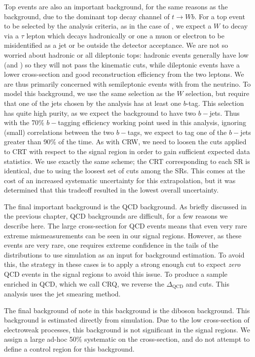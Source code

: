 Top events are also an important background, for the same reasons as the \wjets background, due to the dominant top decay channel of $t \rightarrow Wb$.
For a top event to be selected by the analysis criteria, as in the case of \wjets, we expect a $W$ to decay via a $\tau$ lepton which decays hadronically or one a muon or electron to be misidentified as a jet or be outside the detector acceptance.
We are not so worried about hadronic or all dileptonic tops: hadronic \ttbar events generally have low \met (and ) so they will not pass the kinematic cuts, while dileptonic \ttbar events have a lower cross-section and good reconstruction efficiency from the two leptons.
We are thus primarily concerned with semileptonic \ttbar events with \met from the neutrino.
To model this background, we use the same selection as the $W$ selection, but require that one of the jets chosen by the analysis has at least one $b$-tag.
This selection has quite high purity, as we expect the \ttbar background to have two $b-$jets.
Thus with the 70\% $b-$tagging efficiency working point used in this analysis, ignoring (small) correlations between the two $b-$tags, we expect to tag one of the $b-$jets greater than 90\% of the time.
As with CRW, we need to loosen the cuts applied to CRT with respect to the signal region in order to gain sufficient expected data statistics.
We use exactly the same scheme; the CRT corresponding to each SR is identical, due to using the loosest set of cuts among the SRs.
This comes at the cost of an increased systematic uncertainty for this extrapolation, but it was determined that this tradeoff resulted in the lowest overall uncertainty.

The final important background is the QCD background.
As briefly discussed in the previous chapter, QCD backgrounds are difficult, for a few reasons we describe here.
The large cross-section for QCD events means that even very rare extreme mismeasurements can be seen in our signal regions.
However, as these events are very rare, one requires extreme confidence in the tails of the distributions to use simulation as an input for background estimation.
To avoid this, the strategy in these cases is to apply a strong enough cut to expect \textit{zero} QCD events in the signal regions to avoid this issue.
To produce a sample enriched in QCD, which we call CRQ, we reverse the $\Delta_{\mathrm{QCD}}$ and  cuts.
This analysis uses the jet smearing method.

The final background of note in this background is the diboson background.
This background is estimated directly from simulation.
Due to the low cross-section of electroweak processes, this background is not significant in the signal regions.
We assign a large ad-hoc 50\% systematic on the cross-section, and do not attempt to define a control region for this background.

